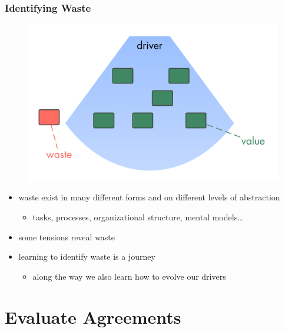 \subsubsection{Identifying Waste}
\label{identifyingwaste}

\begin{figure}[htbp]
\centering
\includegraphics[keepaspectratio,width=\textwidth,height=0.75\textheight]{img/workflow-and-value/drivers-value-waste.png}
\end{figure}

\begin{itemize}
\item waste exist in many different forms and on different levels of abstraction

\begin{itemize}
\item tasks, processes, organizational structure, mental models{\ldots}

\end{itemize}

\item some tensions reveal waste

\item learning to identify waste is a journey

\begin{itemize}
\item along the way we also learn how to evolve our drivers

\end{itemize}

\end{itemize}

\section{Evaluate Agreements}
\label{evaluateagreements}

